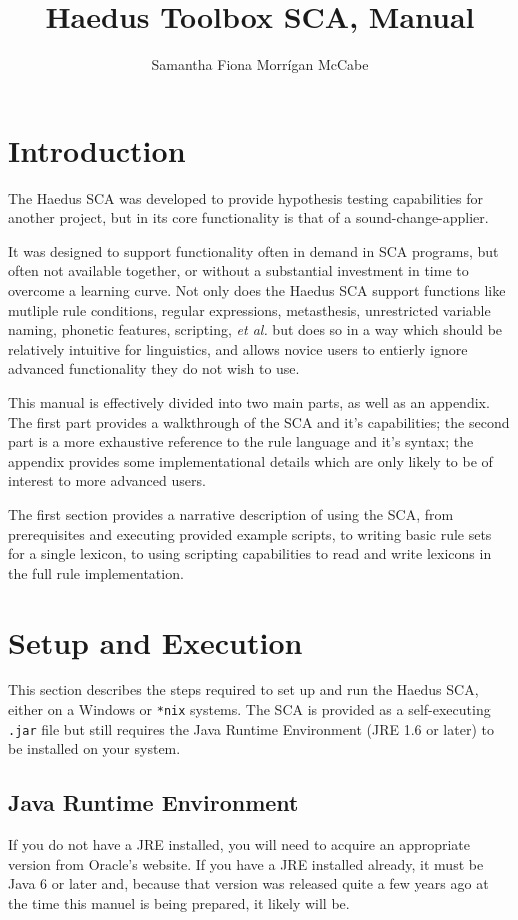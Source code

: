 \documentclass[10pt,letterpaper]{article}
\title{Haedus Toolbox SCA, Manual}
\author{Samantha Fiona Morrígan McCabe}
\begin{document}
\maketitle

\section{Introduction}\label{sec:intro}
The Haedus SCA was developed to provide hypothesis testing capabilities for another project, but in its core functionality is that of a sound-change-applier.

It was designed to support functionality often in demand in SCA programs, but often not available together, or without a substantial investment in time to overcome a learning curve. Not only does the Haedus SCA support functions like mutliple rule conditions, regular expressions, metasthesis, unrestricted variable naming, phonetic features, scripting, \emph{et al.} but does so in a way which should be relatively intuitive for linguistics, and allows novice users to entierly ignore advanced functionality they do not wish to use.

This manual is effectively divided into two main parts, as well as an appendix. The first part provides a walkthrough of the SCA and it's capabilities; the second part is a more exhaustive reference to the rule language and it's syntax; the appendix provides some implementational details which are only likely to be of interest to more advanced users.

The first section provides a narrative description of using the SCA, from prerequisites and executing provided example scripts, to writing basic rule sets for a single lexicon, to using scripting capabilities to read and write lexicons in the full rule implementation.

\section{Setup and Execution}\label{sec:setup}
This section describes the steps required to set up and run the Haedus SCA, either on a Windows or \texttt{*nix} systems. The SCA is provided as a self-executing \texttt{.jar} file but still requires the Java Runtime Environment (JRE 1.6 or later) to be installed on your system.

\subsection{Java Runtime Environment}\label{sec:java}
If you do not have a JRE installed, you will need to acquire an appropriate version from Oracle's website. If you have a JRE installed already, it must be Java 6 or later and, because that version was released quite a few years ago at the time this manuel is being prepared, it likely will be.
\end{document}
